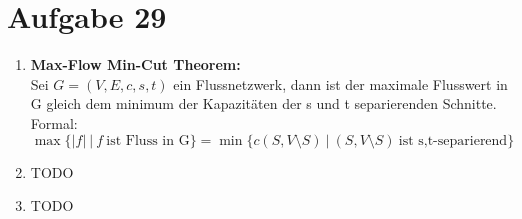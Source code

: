 \documentclass[10pt,a4paper]{article}
\begin{document}
     \begin{figure}[!htb]
        \centering
    \end{figure}
\section*{Aufgabe 29}

    \begin{enumerate}[label={\alph*)}]
        \item \textbf{Max-Flow Min-Cut Theorem:}
            \\ Sei $G=(V,E,c,s,t)$ ein Flussnetzwerk, dann ist der maximale Flusswert in G gleich dem
                minimum der Kapazitäten der s und t separierenden Schnitte. Formal:
                $$
                    \max\{|f| \: |\: f \: \text{ist Fluss in G} \} = \min\{c(S,V \setminus S)\: |\: (S,V \setminus S) \:\text{ist s,t-separierend} \}
                $$
        \item TODO
        \item TODO
  
    \end{enumerate}
\end{document}
